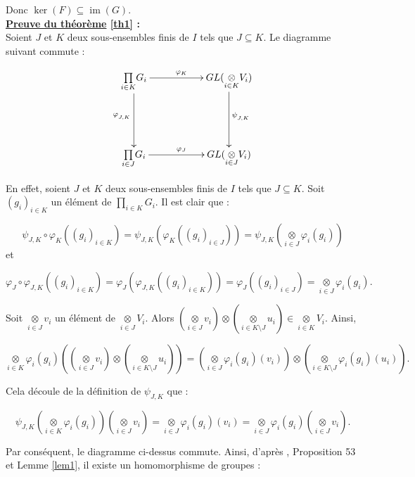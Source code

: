 \documentclass[a4paper, 14pt]{report}
\begin{document}
\begin{onehalfspace}
{			Donc \( \ker(F) \subseteq \operatorname{im}(G) \).\\
			
			\textbf{\underline{Preuve du théorème} \ref{th1} :}\\ 
			Soient \( J \) et \( K \) deux sous-ensembles finis de \( I \) tels que \( J \subseteq K \). Le diagramme suivant commute :
			
			$$
			\xymatrix{
				\underset{i\in K} \prod G_i \ar@{->}[rr]^{\varphi_{K}} \ar@{->}[dd]_{\varphi_{_{J,K}}} && GL(\underset{i\in K} \otimes V_i) \ar@{->}[dd]^{\psi_{_{J,K}}} \\
				&& \\
				\underset{i\in J} \prod G_i \ar@{->}[rr]^{\varphi_{J}} && GL(\underset{i\in J} \otimes V_i)
			}
			$$
			
			En effet, soient \( J \) et \( K \) deux sous-ensembles finis de \( I \) tels que \( J \subseteq K \). Soit \( (g_i)_{i \in K} \) un élément de \( \underset{i\in K} \prod G_i \). Il est clair que :
			
			$$
			\psi_{J,K} \circ \varphi_{K} ((g_i)_{i\in K}) = \psi_{J, K}(\varphi_{K} ((g_i)_{i\in J})) = \psi_{J,K}(\underset{i\in J} \otimes \varphi_{i}(g_i))
			$$
			et
			
			$$
			\varphi_{J} \circ \varphi_{J,K} ((g_i)_{i\in K}) = \varphi_{J}(\varphi_{J,K}((g_i)_{i\in K})) = \varphi_{J} ((g_i)_{i\in J}) = \underset{i\in J} \otimes \varphi_{i}(g_i).
			$$
			
			Soit \( \underset{i\in J} \otimes v_i \) un élément de \( \underset{i\in J} \otimes V_i \). Alors \( (\underset{i\in J} \otimes v_i) \otimes (\underset{i\in K \setminus J} \otimes u_i) \in \underset{i\in K} \otimes V_i \). Ainsi,
			
			$$
			\underset{i\in K} \otimes \varphi_{i}(g_i) \left( (\underset{i\in J} \otimes v_i) \otimes (\underset{i\in K \setminus J} \otimes u_i) \right) = (\underset{i\in J} \otimes \varphi_{i}(g_i)(v_i)) \otimes (\underset{i\in K \setminus J} \otimes \varphi_{i}(g_i)(u_i)).
			$$
			
			Cela découle de la définition de \( \psi_{J,K} \) que :
			
			$$
			\psi_{J,K}(\underset{i\in K} \otimes \varphi_{i}(g_i))(\underset{i\in J} \otimes v_{i}) = \underset{i\in J} \otimes \varphi_{i}(g_i)(v_i) = \underset{i\in J} \otimes \varphi_{i}(g_i)(\underset{i\in J} \otimes v_i).
			$$
			
			Par conséquent, le diagramme ci-dessus commute. Ainsi, d'après \cite{deschamps}, Proposition 53 et Lemme \ref{lem1}, il existe un homomorphisme de groupes :
			
}
\end{onehalfspace}
\end{document}
